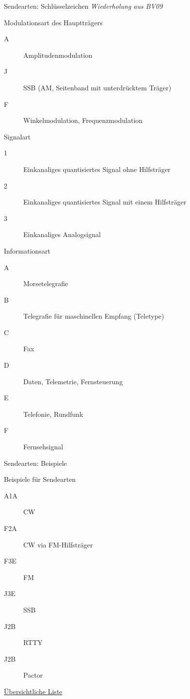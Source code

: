\begin{frame}[allowframebreaks]{Sendearten: Schlüsselzeichen}
  \emph{Wiederholung aus BV09}

  \begin{block}{Modulationsart des Hauptträgers}
    \begin{description}
      \item[A] Amplitudenmodulation
      \item[J] SSB (AM, Seitenband mit unterdrücktem Träger)
      \item[F] Winkelmodulation, Frequenzmodulation
    \end{description}
  \end{block}

  \begin{block}{Signalart}
    \begin{description}
      \item[1] Einkanaliges quantisiertes Signal ohne Hilfsträger
      \item[2] Einkanaliges quantisiertes Signal mit einem Hilfsträger
      \item[3] Einkanaliges Analogsignal
    \end{description}
  \end{block}

  \begin{block}{Informationsart}
    \begin{description}
      \item[A] Morsetelegrafie
      \item[B] Telegrafie für maschinellen Empfang (Teletype)
      \item[C] Fax
      \item[D] Daten, Telemetrie, Fernsteuerung
      \item[E] Telefonie, Rundfunk
      \item[F] Fernsehsignal
    \end{description}
  \end{block}
\end{frame}

\begin{frame}{Sendearten: Beispiele}
  \begin{exampleblock}{Beispiele für Sendearten}
    \begin{description}
      \item[A1A] CW
      \item[F2A] CW via FM-Hilfsträger
      \item[F3E] FM
      \item[J3E] SSB
      \item[J2B] RTTY
      \item[J2B] Pactor
    \end{description}
  \end{exampleblock}

  \href{https://de.wikipedia.org/wiki/Modulationsart}{\ExternalLink Übersichtliche Liste}
\end{frame}

